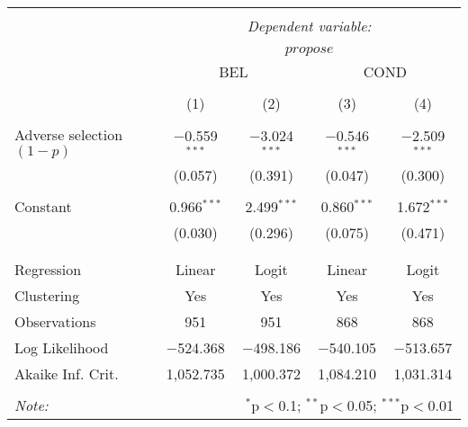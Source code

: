 
\begin{tabular}{@{\extracolsep{5pt}}lcccc} 
\\[-1.8ex]\hline 
\hline \\[-1.8ex] 
 & \multicolumn{4}{c}{\textit{Dependent variable:}} \\ 
\cline{2-5} 
\\[-1.8ex] & \multicolumn{4}{c}{$propose$} \\ 
 & \multicolumn{2}{c}{BEL} & \multicolumn{2}{c}{COND} \\ 
\\[-1.8ex] & (1) & (2) & (3) & (4)\\ 
\hline \\[-1.8ex] 
 Adverse selection $(1-p)$ & $-$0.559$^{***}$ & $-$3.024$^{***}$ & $-$0.546$^{***}$ & $-$2.509$^{***}$ \\ 
  & (0.057) & (0.391) & (0.047) & (0.300) \\ 
  & & & & \\ 
 Constant & 0.966$^{***}$ & 2.499$^{***}$ & 0.860$^{***}$ & 1.672$^{***}$ \\ 
  & (0.030) & (0.296) & (0.075) & (0.471) \\ 
  & & & & \\ 
\hline \\[-1.8ex] 
Regression & Linear & Logit & Linear & Logit \\ 
Clustering & Yes & Yes & Yes & Yes \\ 
Observations & 951 & 951 & 868 & 868 \\ 
Log Likelihood & $-$524.368 & $-$498.186 & $-$540.105 & $-$513.657 \\ 
Akaike Inf. Crit. & 1,052.735 & 1,000.372 & 1,084.210 & 1,031.314 \\ 
\hline 
\hline \\[-1.8ex] 
\textit{Note:}  & \multicolumn{4}{r}{$^{*}$p$<$0.1; $^{**}$p$<$0.05; $^{***}$p$<$0.01} \\ 
\end{tabular} 
